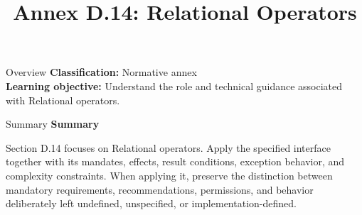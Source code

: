 \documentclass[10pt,letterpaper]{article}
\title{Annex D.14: Relational Operators}
\author{}
\date{}
\begin{document}
\maketitle
\begin{CornellOverviewBox}{Overview}
\textbf{Classification:} Normative annex\\[2pt]
\textbf{Learning objective:} Understand the role and technical guidance associated with Relational operators.
\end{CornellOverviewBox}\begin{CornellSummaryBox}{Summary}
{\sffamily\bfseries\color{Accent} Summary}\par\vspace{3pt}Section D.14 focuses on Relational operators. Apply the specified interface together with its mandates, effects, result conditions, exception behavior, and complexity constraints. When applying it, preserve the distinction between mandatory requirements, recommendations, permissions, and behavior deliberately left undefined, unspecified, or implementation-defined.
\end{CornellSummaryBox}
\end{document}
